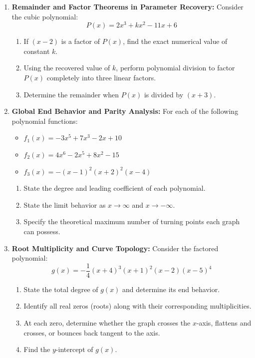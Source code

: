 \begin{enumerate}
    \item \textbf{Remainder and Factor Theorems in Parameter Recovery:} Consider the cubic polynomial:
    $$P(x) = 2x^3 + k x^2 - 11x + 6$$
    \begin{enumerate}
        \item If $(x - 2)$ is a factor of $P(x)$, find the exact numerical value of constant $k$.
        \item Using the recovered value of $k$, perform polynomial division to factor $P(x)$ completely into three linear factors.
        \item Determine the remainder when $P(x)$ is divided by $(x + 3)$.
    \end{enumerate}

    \item \textbf{Global End Behavior and Parity Analysis:} For each of the following polynomial functions:
    \begin{itemize}
        \item $f_1(x) = -3x^5 + 7x^3 - 2x + 10$
        \item $f_2(x) = 4x^6 - 2x^5 + 8x^2 - 15$
        \item $f_3(x) = -(x - 1)^2 (x + 2)^2 (x - 4)$
    \end{itemize}
    \begin{enumerate}
        \item State the degree and leading coefficient of each polynomial.
        \item State the limit behavior as $x \to \infty$ and $x \to -\infty$.
        \item Specify the theoretical maximum number of turning points each graph can possess.
    \end{enumerate}

    \item \textbf{Root Multiplicity and Curve Topology:} Consider the factored polynomial:
    $$g(x) = -\frac{1}{4} (x + 4)^3 (x + 1)^2 (x - 2) (x - 5)^4$$
    \begin{enumerate}
        \item State the total degree of $g(x)$ and determine its end behavior.
        \item Identify all real zeros (roots) along with their corresponding multiplicities.
        \item At each zero, determine whether the graph crosses the $x$-axis, flattens and crosses, or bounces back tangent to the axis.
        \item Find the $y$-intercept of $g(x)$.
    \end{enumerate}


\end{enumerate}
